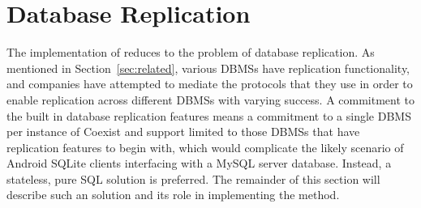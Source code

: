 \section{Database Replication} \label{sec:replication}





The implementation of \schema reduces to the problem of database replication.
As mentioned in Section~\ref{sec:related}, various DBMSs have replication
functionality, and companies have attempted to mediate the protocols that they
use in order to enable replication across different DBMSs with varying success.
A commitment to the built in database replication features means a commitment to
a single DBMS per instance of Coexist and support limited to those DBMSs that
have replication features to begin with, which would complicate the likely
scenario of Android SQLite clients interfacing with a MySQL server database. 
Instead, a stateless, pure SQL solution is preferred. The remainder of
this section will describe such an solution and its role in implementing
the \schema method.


